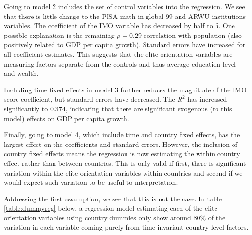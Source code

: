 \documentclass[11pt]{article}
\begin{document}
Going to model 2 includes the set of control variables into the regression. We see that there is little change to the PISA math in global 99 and ARWU institutions variables. The coefficient of the IMO variable has decreased by half to 5. One possible explanation is the remaining $\rho=0.29$ correlation with population (also positively related to GDP per capita growth). Standard errors have increased for all coefficient estimates. This suggests that the elite orientation variables are measuring factors separate from the controls and thus average education level and wealth.

Including time fixed effects in model 3 further reduces the magnitude of the IMO score coefficient, but standard errors have decreased. The $R^2$ has increased significantly to 0.374, indicating that there are significant exogenous (to this model) effects on GDP per capita growth.

Finally, going to model 4, which include time and country fixed effects, has the largest effect on the coefficients and standard errors. However, the inclusion of country fixed effects means the regression is now estimating the within country effect rather than between countries. This is only valid if first, there is significant variation within the elite orientation variables within countries and second if we would expect such variation to be useful to interpretation.

Addressing the first assumption, we see that this is not the case. In table \ref{table:dummyreg} below, a regression model estimating each of the elite orientation variables using country dummies only show around 80\% of the variation in each variable coming purely from time-invariant country-level factors.
\end{document}
